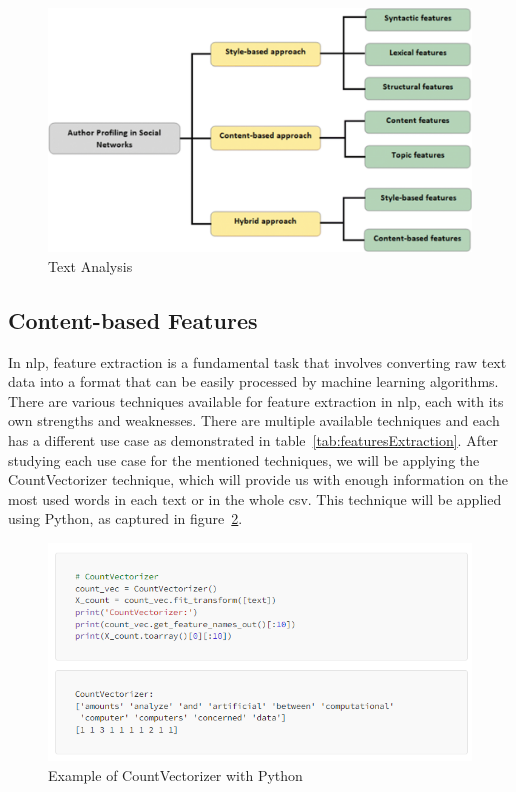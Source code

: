 \begin{figure}[H]
\centering
\includegraphics[width=13cm]{features}
\caption{Text Analysis}
\label{fig:features}
\end{figure}

\subsection{Content-based Features}
In \ac{nlp}, feature extraction \cite{tabassum2020survey} is a fundamental task that involves converting raw text data into a format that can be easily processed by machine learning algorithms. There are various techniques available for feature extraction in \ac{nlp}, each with its own strengths and weaknesses. There are multiple available techniques and each has a different use case as demonstrated in table~\ref{tab:featuresExtraction}. After studying each use case for the mentioned techniques, we will be applying the CountVectorizer technique, which will provide us with enough information on the most used words in each text or in the whole \ac{csv}. This technique will be applied using Python, as captured in figure~\ref{fig:CountVectorizer}.

\begin{figure}[H]
\centering
\includegraphics[width=15cm]{CountVectorizer}
\caption{Example of CountVectorizer with Python\cite{Eskandar_2023}}
\label{fig:CountVectorizer}
\end{figure}

